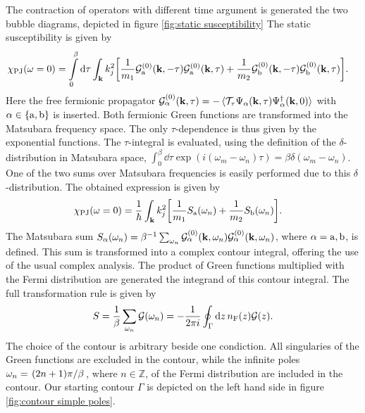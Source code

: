 The contraction of operators with different time argument is generated the two bubble diagrams, depicted in figure \ref{fig:static susceptibility}
The static susceptibility is given by
%
\begin{align}
	\chi_{\mathrm{PJ}}(\omega = 0) &= 
		\int\limits_{0}^{\beta} \dd{\tau} 
		\int_{\vb{k}} 
		k_{j}^{2}
		\bigg[
			\frac{1}{m_{1}}
			\mathcal{G}_{\mathrm{a}}^{(0)}(\vb{k},-\tau)
			\mathcal{G}_{\mathrm{a}}^{(0)}(\vb{k},\tau)
			+
			\frac{1}{m_{2}}
			\mathcal{G}_{\mathrm{b}}^{(0)}(\vb{k},-\tau)
			\mathcal{G}_{\mathrm{b}}^{(0)}(\vb{k},\tau)
		\bigg].
\end{align}
%
Here the free fermionic propagator $\mathcal{G}_{\alpha}^{(0)}(\vb{k},\tau) = -\expval*{\mathcal{T}_{\tau} \Psi_{\alpha}(\vb{k},\tau) \Psi_{\alpha}^{\dag}(\vb{k},0)}$ with $\alpha \in \{\mathrm{a},\mathrm{b}\}$ is inserted.
Both fermionic Green functions are transformed into the Matsubara frequency space.
The only $\tau$-dependence is thus given by the exponential functions.
The $\tau$-integral is evaluated, using the definition of the $\delta$-distribution in Matsubara space, $\int_{0}^{\beta} \dd{\tau} \exp(i(\omega_{m} - \omega_{n})\tau) = \beta \delta(\omega_{m} - \omega_{n})$.
One of the two sums over Matsubara frequencies is easily performed due to this $\delta$-distribution.
The obtained expression is given by
%
\begin{align}
	\chi_{\mathrm{PJ}}(\omega = 0) &= 
		\frac{1}{\hbar} 
		\int_{\vb{k}} 
		k_{j}^{2}
		\bigg[
			\frac{1}{m_{1}}
			S_{\mathrm{a}}(\omega_{n})
			+
			\frac{1}{m_{2}}
			S_{\mathrm{b}}(\omega_{n})
		\bigg].
\end{align}
%
The Matsubara sum $S_{\alpha}(\omega_{n}) = \beta^{-1} \sum_{\omega_{n}} \mathcal{G}_{\alpha}^{(0)}(\vb{k},\omega_{n}) \mathcal{G}_{\alpha}^{(0)}(\vb{k},\omega_{n})$, where $\alpha = \mathrm{a}, \mathrm{b}$, is defined.
This sum is transformed into a complex contour integral, offering the use of the usual complex analysis.
The product of Green functions multiplied with the Fermi distribution are generated the integrand of this contour integral.
The full transformation rule is given by
%
\begin{align}
	S = \frac{1}{\beta} \sum\limits_{\omega_{n}} \mathcal{G}(\omega_{n}) = -\frac{1}{2\pi i} \oint_{\Gamma} \dd{z} n_{\mathrm{F}}(z) \mathcal{G}(z).
\end{align}
%
The choice of the contour is arbitrary beside one condiction.
All singularies of the Green functions are excluded in the contour, while the infinite poles $\omega_{n} = \flatfrac{(2n+1)\pi}{\beta}$, where $n\in\mathbb{Z}$, of the Fermi distribution are included in the contour.
Our starting contour $\Gamma$ is depicted on the left hand side in figure \ref{fig:contour simple poles}.

